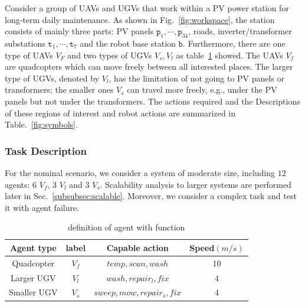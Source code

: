 Consider a group of UAVs and UGVs that work within a PV power station for
long-term daily maintenance.
As shown in Fig.~\ref{fig:workspace},
the station consists of mainly three parts: PV panels $\texttt{p}_1,\cdots,\texttt{p}_{34}$, roads,
inverter/transformer substations $\texttt{t}_1,\cdots,\texttt{t}_7$ and the robot base station $\texttt{b}$. 
Furthermore, there are one type of UAVs $V_F$ and two types of UGVs $V_s,V_l$ as table~\ref{table:agent} showed.
The UAVs $V_f$ are quadcopters which can move freely between all interested places.
The larger type of UGVs, denoted by $V_l$, has the limitation of not going to PV panels or transformers;
the smaller ones $V_s$ can travel more freely, e.g., under the PV panels but not under the transformers. 
The actions required and the  
Descriptions of these regions of interest and robot actions are summarized in
Table.~\ref{fig:symbols}.

\subsubsection{Task Description}\label{subsubsec:task}

For the nominal scenario, we consider a system of moderate size,
including $12$ agents: 6 $V_f$, 3 $V_l$ and 3 $V_s$.
Scalability analysis to larger systems are performed later in Sec.~\ref{subsubsec:scalable}.
Moreover, we consider a complex task and test it with agent failure.

\begin{table}[t]\footnotesize
\caption{definition of agent with function}
\label{table:agent}
\begin{tabular}{|c|c|c|c|}\hline
	\textbf{Agent type} &\textbf{label} & \textbf{Capable action} & \textbf{Speed}$(m/ s )$\\ \hline
	 Quadcopter& $V_f$  & $temp, scan, wash $ & 10 \\ \hline
	 Larger UGV& $V_l$  & $wash,repair_l,fix$ & 4 \\ \hline
	 Smaller UGV& $V_s$  &  $sweep, mow, repair_s, fix$ & 4 \\ \hline
\end{tabular}
\end{table}


